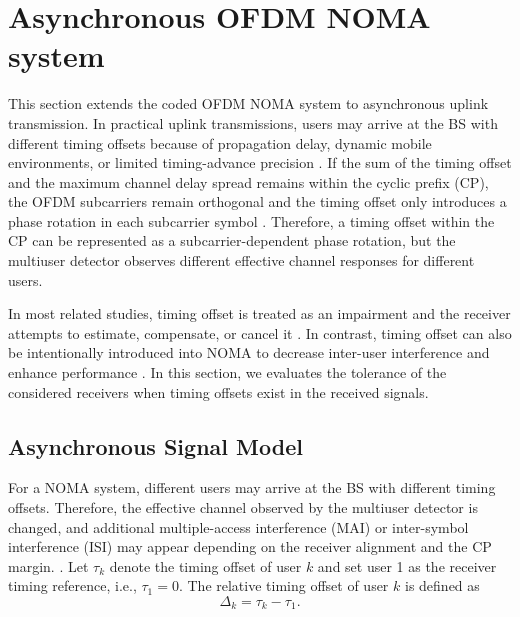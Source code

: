 \section{Asynchronous OFDM NOMA system}
\label{sec:asyn}

This section extends the coded OFDM NOMA system to asynchronous uplink transmission. In practical uplink transmissions, users may arrive at the BS with different timing offsets because of propagation delay, dynamic mobile environments, or limited timing-advance precision \cite{lin2023uplink,haci2017performance,abeywickrama2017over}. If the sum of the timing offset and the maximum channel delay spread remains within the cyclic prefix (CP), the OFDM subcarriers remain orthogonal and the timing offset only introduces a phase rotation in each subcarrier symbol \cite{minn2003robust}. Therefore, a timing offset within the CP can be represented as a subcarrier-dependent phase rotation, but the multiuser detector observes different effective channel responses for different users.

In most related studies, timing offset is treated as an impairment and the receiver attempts to estimate, compensate, or cancel it \cite{lin2023uplink,haci2017performance,minn2003robust}. In contrast, timing offset can also be intentionally introduced into NOMA to decrease inter-user interference and enhance performance \cite{li2023transceiver}. In this section, we evaluates the tolerance of the considered receivers when timing offsets exist in the received signals.

\subsection{Asynchronous Signal Model}

For a NOMA system, different users may arrive at the BS with different timing offsets. Therefore, the effective channel observed by the multiuser detector is changed, and additional  multiple-access interference (MAI) or inter-symbol interference  (ISI) may appear depending on the receiver alignment and the CP margin. \cite{lin2023uplink}. Let $\tau_k$ denote the timing offset of user $k$ and set user 1 as the receiver timing reference, i.e., $\tau_1=0$. The relative timing offset of user $k$ is defined as
\begin{equation}
    \Delta_k
    =
    \tau_k-\tau_1 .
    \label{eq:async-relative-delay}
\end{equation}


